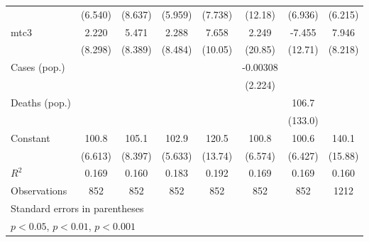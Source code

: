 \documentclass{article}
\begin{document}
{\begin{longtable}{l*{7}{c}}
                &  (6.540)         &  (8.637)         &  (5.959)         &  (7.738)         &  (12.18)         &  (6.936)         &  (6.215)         \\
mtc3            &    2.220         &    5.471         &    2.288         &    7.658         &    2.249         &   -7.455         &    7.946         \\
                &  (8.298)         &  (8.389)         &  (8.484)         &  (10.05)         &  (20.85)         &  (12.71)         &  (8.218)         \\
Cases (pop.)    &                  &                  &                  &                  & -0.00308         &                  &                  \\
                &                  &                  &                  &                  &  (2.224)         &                  &                  \\
Deaths (pop.)   &                  &                  &                  &                  &                  &    106.7         &                  \\
                &                  &                  &                  &                  &                  &  (133.0)         &                  \\
Constant        &    100.8\sym{***}&    105.1\sym{***}&    102.9\sym{***}&    120.5\sym{***}&    100.8\sym{***}&    100.6\sym{***}&    140.1\sym{***}\\
                &  (6.613)         &  (8.397)         &  (5.633)         &  (13.74)         &  (6.574)         &  (6.427)         &  (15.88)         \\
\hline
\(R^{2}\)       &    0.169         &    0.160         &    0.183         &    0.192         &    0.169         &    0.169         &    0.160         \\
Observations    &      852         &      852         &      852         &      852         &      852         &      852         &     1212         \\
\hline\hline
\multicolumn{8}{l}{\footnotesize Standard errors in parentheses}\\
\multicolumn{8}{l}{\footnotesize \sym{*} \(p<0.05\), \sym{**} \(p<0.01\), \sym{***} \(p<0.001\)}\\
\end{longtable}
}
\end{document}
